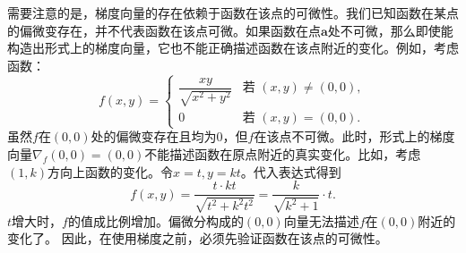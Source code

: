 \documentclass[12pt,UTF8,fontset=none]{ctexbook}
\begin{document}

需要注意的是，梯度向量的存在依赖于函数在该点的可微性。我们已知函数在某点的偏微变存在，并不代表函数在该点可微。如果函数在点$\mathbf{a}$处不可微，那么即使能构造出形式上的梯度向量，它也不能正确描述函数在该点附近的变化。例如，考虑函数：
$$ f(x,y) = \begin{cases}
\dfrac{xy}{\sqrt{x^2+y^2}} & \text{若 } (x,y) \neq (0,0), \\
0 & \text{若 } (x,y) = (0,0).
\end{cases} $$
虽然$f$在$(0,0)$处的偏微变存在且均为$0$，但$f$在该点不可微。此时，形式上的梯度向量$\nabla_f(0,0) = (0,0)$不能描述函数在原点附近的真实变化。比如，考虑$(1,k)$方向上函数的变化。令$x = t, y = kt$。代入表达式得到
$$ f(x, y) = \frac{t\cdot kt}{\sqrt{t^2 + k^2t^2}} = \frac{k}{\sqrt{k^2 + 1}}\cdot t.$$
$t$增大时，$f$的值成比例增加。偏微分构成的$(0,0)$向量无法描述$f$在$(0,0)$附近的变化了。
因此，在使用梯度之前，必须先验证函数在该点的可微性。
\end{document}
